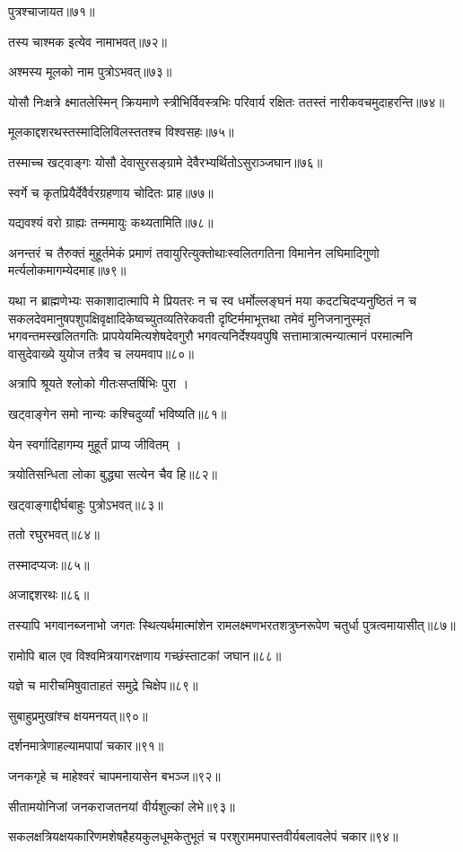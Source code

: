 पुत्रश्चाजायत॥७१॥

तस्य चाश्मक इत्येव नामाभवत्॥७२॥

अश्मस्य मूलको नाम पुत्रोऽभवत्॥७३॥

योसौ निःक्षत्रे क्ष्मातलेस्मिन् क्रियमाणे स्त्रीभिर्विवस्त्रभिः परिवार्य रक्षितः ततस्तं
नारीकवचमुदाहरन्ति॥७४॥

मूलकाद्दशरथस्तस्मादिलिविलस्ततश्च विश्वसहः॥७५॥

तस्माच्च खट्वाङ्गः योसौ देवासुरसङ्ग्रामे देवैरभ्यर्थितोऽसुराञ्जघान॥७६॥

स्वर्गे च कृतप्रियैर्देवैर्वरग्रहणाय चोदितः प्राह॥७७॥

यद्यवश्यं वरो ग्राह्यः तन्ममायुः कथ्यतामिति॥७८॥

अनन्तरं च तैरुक्तं मुहूर्तमेकं प्रमाणं तवायुरित्युक्तोथाःस्वलितगतिना विमानेन लघिमादिगुणो
मर्त्यलोकमागम्येदमाह॥७९॥

यथा न ब्राह्मणेभ्यः सकाशादात्मापि मे प्रियतरः न च स्व धर्मोल्लङ्घनं मया
कदटचिदप्यनुष्ठितं न च सकलदेवमानुषपशुपक्षिवृक्षादिकेष्वच्युतव्यतिरेकवती दृष्टिर्ममाभूत्तथा तमेवं
मुनिजनानुस्मृतं भगवन्तमस्खलितगतिः प्रापयेयमित्यशेषदेवगुरौ भगवत्यनिर्देश्यवपुषि
सत्तामात्रात्मन्यात्मानं परमात्मनि वासुदेवाख्ये युयोज तत्रैव च लयमवाप॥८०॥

अत्रापि श्रूयते श्लोको गीतःसप्तर्षिभिः पुरा ।

खट्वाङ्गेन समो नान्यः कश्चिदुर्व्यां भविष्यति॥८१॥

येन स्वर्गादिहागम्य मुहूर्तं प्राप्य जीवितम् ।

त्रयोतिसन्धिता लोका बुद्ध्या सत्येन चैव हि॥८२॥

खट्वाङ्गाद्दीर्घबाहुः पुत्रोऽभवत्॥८३॥

ततो रघुरभवत्॥८४॥

तस्मादप्यजः॥८५॥

अजाद्दशरथः॥८६॥

तस्यापि भगवानब्जनाभो जगतः स्थित्यर्थमात्मांशेन रामलक्ष्मणभरतशत्रुघ्नरूपेण चतुर्धा
पुत्रत्वमायासीत्॥८७॥

रामोपि बाल एव विश्वमित्रयागरक्षणाय गच्छंस्ताटकां जघान॥८८॥

यज्ञे च मारीचमिषुवाताहतं समुद्रे चिक्षेप॥८९॥

सुबाहुप्रमुखांश्च क्षयमनयत्॥९०॥

दर्शनमात्रेणाहल्यामपापां चकार॥९१॥

जनकगृहे च माहेश्वरं चापमनायासेन बभञ्ज॥९२॥

सीतामयोनिजां जनकराजतनयां वीर्यशुल्कां लेभे॥९३॥

सकलक्षत्रियक्षयकारिणमशेषहैहयकुलधूमकेतुभूतं च परशुराममपास्तवीर्यबलावलेपं चकार॥९४॥

